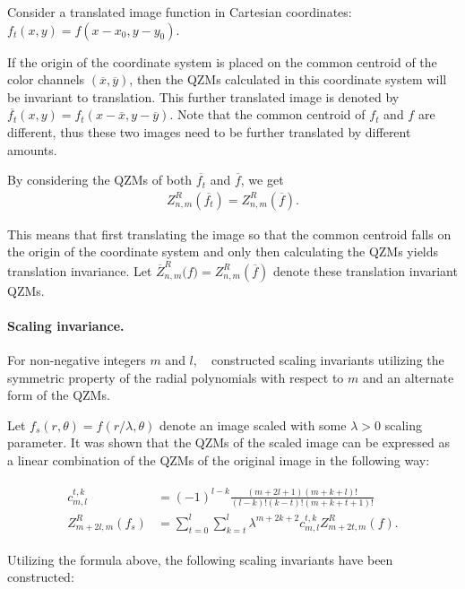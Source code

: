 Consider a translated image function in Cartesian coordinates: $f_t(x,y) = f(x - x_0, y - y_0)$. 

If the origin of the coordinate system is placed on the common centroid of the color channels $(\overline{x}, \overline{y})$, then the QZMs calculated in this coordinate system will be invariant to translation. This further translated image is denoted by $\overline{f_t}(x,y) = f_t(x - \overline{x}, y - \overline{y})$. Note that the common centroid of $f_t$ and $f$ are different, thus these two images need to be further translated by different amounts.


By considering the QZMs of both $\overline{f_t}$ and $\overline{f}$, we get
\begin{gather*}
    {Z}_{n,m}^R\left(\overline{f_t}\right) = {Z}_{n,m}^R\left(\overline{f}\right).
\end{gather*}


This means that first translating the image so that the common centroid falls on the origin of the coordinate system and only then calculating the QZMs yields translation invariance. 
Let $\overline{Z}_{n,m}^R\big(f\big) = {Z}_{n,m}^R\left(\overline{f}\right)$ denote these translation invariant QZMs.

\paragraph{Scaling invariance.}
For non-negative integers $m$ and $l$, \citeauthor{qzmi}~\cite{qzmi} constructed scaling invariants utilizing the symmetric property of the radial polynomials with respect to $m$ and an alternate form of the QZMs.


Let $f_s(r,\theta) = f(r/\lambda, \theta)$ denote an image scaled with some $\lambda > 0$ scaling parameter. It was shown that the QZMs of the scaled image can be expressed as a linear combination of the QZMs of the original image in the following way:

\begin{gather*}
  \begin{split}
  c_{m,l}^{t,k} &= (-1)^{l-k}\frac{(m + 2l + 1)(m + k + l)!}{(l - k)!(k - t)!(m + k + t + 1)!} \\
  Z_{m + 2l,m}^R(f_s) &= \sum_{t=0}^l\sum_{k=t}^l\lambda^{m+2k+2}c_{m,l}^{t,k}Z_{m+2t,m}^R(f).
  \end{split}
\end{gather*}

Utilizing the formula above, the following scaling invariants have been constructed:


